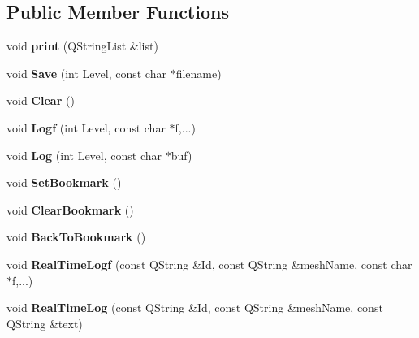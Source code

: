 \subsection*{Public Member Functions}
\begin{DoxyCompactItemize}
\item 
\mbox{\label{class_g_l_log_stream_add3b60f60b1a9fb6da942d8081366154}} 
void {\bfseries print} (Q\+String\+List \&list)
\item 
\mbox{\label{class_g_l_log_stream_a53f5fed730c7c237c5433715b02e8641}} 
void {\bfseries Save} (int Level, const char $\ast$filename)
\item 
\mbox{\label{class_g_l_log_stream_a0412b27ae20c5bd949cb468bae19a9bf}} 
void {\bfseries Clear} ()
\item 
\mbox{\label{class_g_l_log_stream_aaded695fc65626f5917ecf4d9104c0f4}} 
void {\bfseries Logf} (int Level, const char $\ast$f,...)
\item 
\mbox{\label{class_g_l_log_stream_a6f1dd55035bad7b01f4916faa06d0fe6}} 
void {\bfseries Log} (int Level, const char $\ast$buf)
\item 
\mbox{\label{class_g_l_log_stream_a6127cac326a06c74a7c012f12bd933b4}} 
void {\bfseries Set\+Bookmark} ()
\item 
\mbox{\label{class_g_l_log_stream_a0b3885c68adbac65b640aa19d4c7cf69}} 
void {\bfseries Clear\+Bookmark} ()
\item 
\mbox{\label{class_g_l_log_stream_aba1c6b9b92248d2be8d32346e7b819ef}} 
void {\bfseries Back\+To\+Bookmark} ()
\item 
\mbox{\label{class_g_l_log_stream_ab55b6ec865c3b873bd58617fb6711c68}} 
void {\bfseries Real\+Time\+Logf} (const Q\+String \&Id, const Q\+String \&mesh\+Name, const char $\ast$f,...)
\item 
\mbox{\label{class_g_l_log_stream_a2a6377babbb720e05141b82a60d941e9}} 
void {\bfseries Real\+Time\+Log} (const Q\+String \&Id, const Q\+String \&mesh\+Name, const Q\+String \&text)
\end{DoxyCompactItemize}
